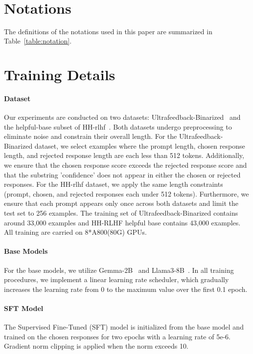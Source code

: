 \newpage
~
\newpage
\section{Notations}
The definitions of the notations used in this paper are summarized in Table~\ref{table:notation}.

\section{Training Details}
\label{section:training_details}
\paragraph{Dataset}
Our experiments are conducted on two datasets: Ultrafeedback-Binarized~\cite{cui2023ultrafeedback} and the helpful-base subset of HH-rlhf~\cite{bai2022traininghelpfulharmlessassistant}. Both datasets undergo preprocessing to eliminate noise and constrain their overall length. For the Ultrafeedback-Binarized dataset, we select examples where the prompt length, chosen response length, and rejected response length are each less than 512 tokens. Additionally, we ensure that the chosen response score exceeds the rejected response score and that the substring 'confidence' does not appear in either the chosen or rejected responses. For the HH-rlhf dataset, we apply the same length constraints (prompt, chosen, and rejected responses each under 512 tokens). Furthermore, we ensure that each prompt appears only once across both datasets and limit the test set to 256 examples. The training set of Ultrafeedback-Binarized contains around 33,000 examples and HH-RLHF helpful base contains 43,000 examples. All training are carried on 8*A800(80G) GPUs.
\paragraph{Base Models}
For the base models, we utilize Gemma-2B~\citep{gemma_2024} and Llama3-8B~\citep{llama3modelcard}. In all training procedures, we implement a linear learning rate scheduler, which gradually increases the learning rate from 0 to the maximum value over the first 0.1 epoch.

\paragraph{SFT Model}
The Supervised Fine-Tuned (SFT) model is initialized from the base model and trained on the chosen responses for two epochs with a learning rate of 5e-6. Gradient norm clipping is applied when the norm exceeds 10.

